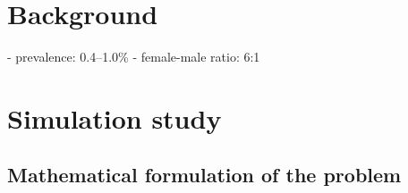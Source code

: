 \section{Background}

- prevalence: 0.4--1.0\%
- female-male ratio: 6:1


\section{Simulation study}
\subsection{Mathematical formulation of the problem}



\subsection{}
\subsection{}
\subsection{}
\section{}